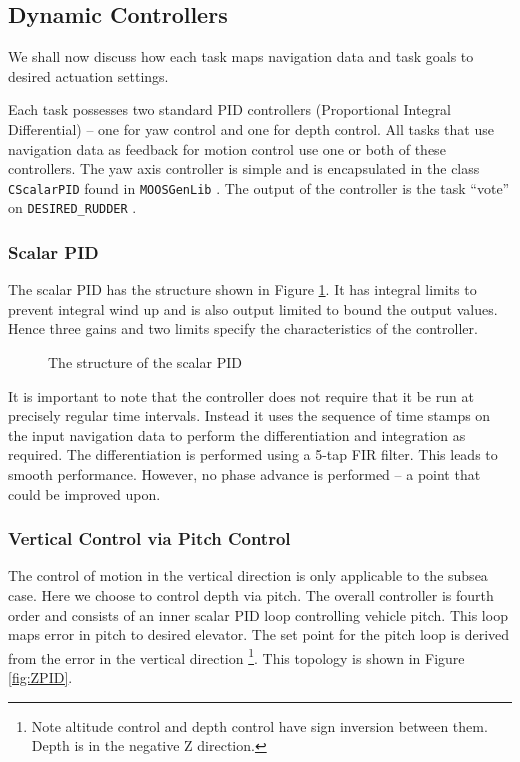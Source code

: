 \documentclass[a4paper,10pt]{article}
\newcommand{\Code}[1]{\texttt{#1} }
\newcommand{\code}[1]{\Code{#1} }
\begin{document}
\subsection{Dynamic Controllers}
We shall now discuss how each task maps navigation data and task
goals to desired actuation settings.

Each task possesses two standard PID controllers (Proportional
Integral Differential) -- one for yaw control and one for depth
control. All tasks that use navigation data as feedback for motion
control use one or both of these controllers. The yaw axis
controller is simple and is encapsulated in the class
\code{CScalarPID} found in \code{MOOSGenLib}. The output of the
controller is the task ``vote'' on \code{DESIRED\_RUDDER}.

\subsubsection{Scalar PID}
The scalar PID has the structure shown in Figure
\ref{fig:ScalarPID}. It has integral limits to prevent integral
wind up and is also output limited to bound the output values.
Hence three gains and two limits specify the characteristics of
the controller.

\begin{figure}[ht]
\label{fig:ScalarPID}
 \centering
{} \caption{The
structure of the scalar PID}
\end{figure}

It is important to note that the controller does not require that
it be run at precisely regular time intervals. Instead it uses the
sequence of time stamps on the input navigation data to perform
the differentiation and integration as required. The
differentiation is performed using a 5-tap FIR filter. This leads
to smooth performance. However, no phase advance is performed -- a
point that could be improved upon.

\subsubsection{Vertical Control via Pitch Control}
The control of motion in the vertical direction is only applicable
to the subsea case. Here we choose to control depth via pitch. The
overall controller is fourth order and consists of an inner scalar
PID loop controlling vehicle pitch. This loop maps error in pitch
to desired elevator.  The set point for the pitch loop is derived
from the error in the vertical direction \footnote{Note altitude
control and depth control have sign inversion between them. Depth
is in the negative Z direction.}. This topology is shown in Figure
\ref{fig:ZPID}.
\end{document}
